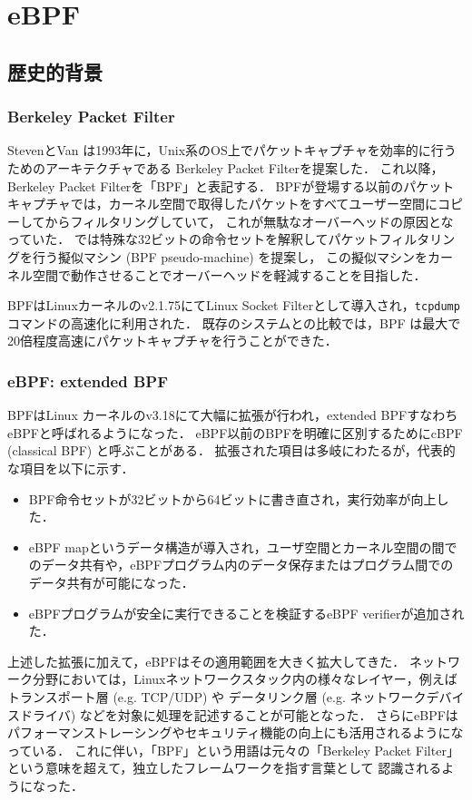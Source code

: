 \chapter{eBPF}
\section{歴史的背景}
\subsection{Berkeley Packet Filter}
StevenとVan \cite{berkeley-packet-filter}は1993年に，Unix系のOS上でパケットキャプチャを効率的に行うためのアーキテクチャである
Berkeley Packet Filterを提案した．
これ以降，Berkeley Packet Filterを「BPF」と表記する．
BPFが登場する以前のパケットキャプチャでは，カーネル空間で取得したパケットをすべてユーザー空間にコピーしてからフィルタリングしていて，
これが無駄なオーバーヘッドの原因となっていた．
\cite{berkeley-packet-filter}では特殊な32ビットの命令セットを解釈してパケットフィルタリングを行う擬似マシン (BPF pseudo-machine) を提案し，
この擬似マシンをカーネル空間で動作させることでオーバーヘッドを軽減することを目指した．

BPFはLinuxカーネルのv2.1.75にてLinux Socket Filterとして導入され，\texttt{tcpdump}コマンドの高速化に利用された．
既存のシステムとの比較では，BPF は最大で20倍程度高速にパケットキャプチャを行うことができた．

\subsection{eBPF: extended BPF}
BPFはLinux カーネルのv3.18にて大幅に拡張が行われ，extended BPFすなわちeBPFと呼ばれるようになった．
eBPF以前のBPFを明確に区別するためにcBPF (classical BPF) と呼ぶことがある．
拡張された項目は多岐にわたるが，代表的な項目を以下に示す．
\begin{itemize}
  \item BPF命令セットが32ビットから64ビットに書き直され，実行効率が向上した．
  \item eBPF mapというデータ構造が導入され，ユーザ空間とカーネル空間の間でのデータ共有や，eBPFプログラム内のデータ保存またはプログラム間でのデータ共有が可能になった．
  \item eBPFプログラムが安全に実行できることを検証するeBPF verifierが追加された．
\end{itemize}

上述した拡張に加えて，eBPFはその適用範囲を大きく拡大してきた．
ネットワーク分野においては，Linuxネットワークスタック内の様々なレイヤー，例えばトランスポート層 (e.g. TCP/UDP) や
データリンク層 (e.g. ネットワークデバイスドライバ) などを対象に処理を記述することが可能となった．
さらにeBPFはパフォーマンストレーシングやセキュリティ機能の向上にも活用されるようになっている．
これに伴い，「BPF」という用語は元々の「Berkeley Packet Filter」という意味を超えて，独立したフレームワークを指す言葉として
認識されるようになった．

